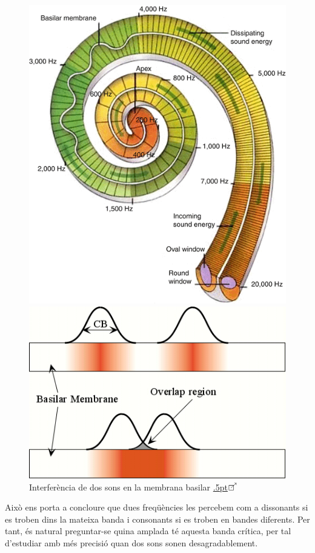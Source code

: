 \documentclass{article}
\theoremstyle{math}
\theoremstyle{TheoremNum}
\newcommand{\0}{\ensuremath{\vb{0}}}
\newcommand\enllas{\raise.5pt\hbox{$\boxempty\kern-4.85pt{}^{\nearrow}$}\kern-2pt}
\begin{document}
\begin{figure}[ht]
    \begin{minipage}[c]{0.49\linewidth}
        \centering
        \includegraphics[height=0.6\linewidth]{Imatges_beamer2/coclea.png}
        \caption{Estructura de la còclea \href{https://www.pinterest.com/pin/336995984614355654/}{\enllas}}
        \label{coclea}
    \end{minipage}
    \hfill
    \begin{minipage}[c]{0.49\linewidth}
        \centering
        \includegraphics[height=0.6\linewidth]{Imatges_beamer2/basilar_membrane.jpg}
        \caption{Interferència de dos sons en la membrana basilar \href{https://www.phys.uconn.edu/~gibson/Notes/Section7_3/Sec7_3.htm}{\enllas}}
        \label{membrana}
    \end{minipage}
\end{figure}
Això ens porta a concloure que dues freqüències les percebem com a dissonants si es troben dins la mateixa banda i consonants si es troben en bandes diferents. Per tant, és natural preguntar-se quina amplada té aquesta banda crítica, per tal d'estudiar amb més precisió quan dos sons sonen desagradablement.\par
\end{document}
